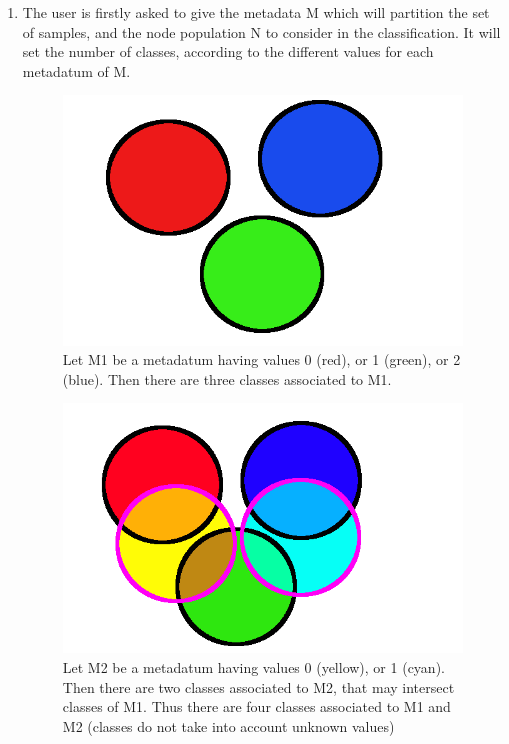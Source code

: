 \documentclass{report}
\begin{document}
\begin{enumerate}
\item The user is firstly asked to give the metadata \textsc{M} which will partition the set of samples, and the node population \textsc{N} to consider in the classification. It will set the number of classes, according to the different values for each metadatum of \textsc{M}.

\begin{figure}[H]
\centering
\includegraphics[scale=0.3]{illustrations/classessimples.png}
\caption{Let \textsc{M1} be a metadatum having values 0 (red), or 1 (green), or 2 (blue). Then there are three classes associated to \textsc{M1}.}
\end{figure}

\begin{figure}[H]
\centering
\includegraphics[scale=0.3]{illustrations/classescomplexes.png}
\caption{Let M2 be a metadatum having values 0 (yellow), or 1 (cyan). Then there are two classes associated to M2, that may intersect classes of M1. Thus there are four classes associated to M1 and M2 (classes do not take into account unknown values)}
\end{figure}


\end{enumerate}
\end{document}
